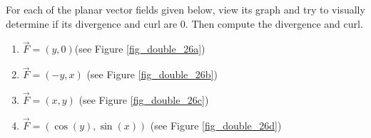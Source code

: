\begin{example}\label{ex_vectorfield1}
For each of the planar vector fields given below, view its graph and try to visually determine if its divergence and curl are 0. Then compute the divergence and curl.

\begin{multicols}{2}
\begin{enumerate}
	\item $\vec F = \left( y,0\right)$\quad  (see Figure \ref{fig_double_26a})
	\item $\vec F = \left( -y,x\right)$ \quad  (see Figure \ref{fig_double_26b})
	\item $\vec F = \left( x,y\right)$ \quad  (see Figure \ref{fig_double_26c})
	\item $\vec F = \left( \cos(y), \sin(x)\right)$ \quad  (see Figure \ref{fig_double_26d})
\end{enumerate}
\end{multicols}


\end{example}
